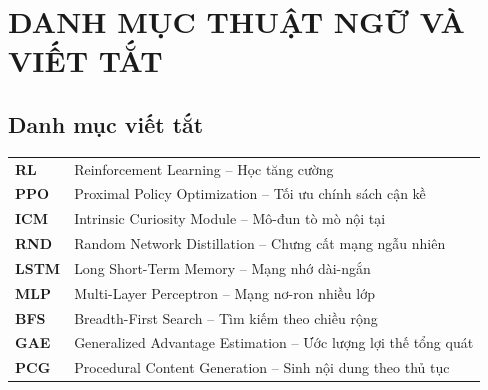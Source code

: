 \clearpage
{}
{}
\chapter*{DANH MỤC THUẬT NGỮ VÀ VIẾT TẮT}

\section*{Danh mục viết tắt}
\renewcommand{\arraystretch}{1.3}
\noindent
\begin{tabular}{p{2.2cm} p{12cm}}
\textbf{RL}   & Reinforcement Learning -- Học tăng cường \\
\textbf{PPO}  & Proximal Policy Optimization -- Tối ưu chính sách cận kề \\
\textbf{ICM}  & Intrinsic Curiosity Module -- Mô-đun tò mò nội tại \\
\textbf{RND}  & Random Network Distillation -- Chưng cất mạng ngẫu nhiên \\
\textbf{LSTM} & Long Short-Term Memory -- Mạng nhớ dài-ngắn \\
\textbf{MLP}  & Multi-Layer Perceptron -- Mạng nơ-ron nhiều lớp \\
\textbf{BFS}  & Breadth-First Search -- Tìm kiếm theo chiều rộng \\
\textbf{GAE}  & Generalized Advantage Estimation -- Ước lượng lợi thế tổng quát \\
\textbf{PCG}  & Procedural Content Generation -- Sinh nội dung theo thủ tục \\
\end{tabular}

\vspace{1em}

